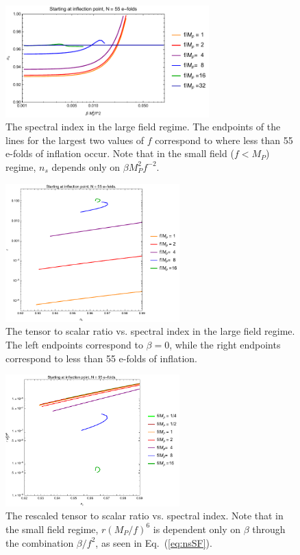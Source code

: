 \documentclass[aps,amsfonts,amsmath,prd,preprint,nofootinbib,superscriptaddress]{revtex4}
\newcommand{\Mp}{{M_{P}}}
\newcommand{\MMp}{{M_P^2}}
\begin{document}
\begin{figure}[!h]
  \centering
    \includegraphics[width=0.7\textwidth]{figures/nsvsb.pdf}
    \caption{The spectral index in the large field regime. The endpoints of the lines for the largest two values of $f$ correspond to where less than 55 e-folds of inflation occur.
    Note that in the small field ($f < \Mp$) regime, $n_s$ depends only on $\beta \MMp f^{-2}$.}
\end{figure}

\begin{figure}[!h]
  \centering
    \includegraphics[width=0.6\textwidth]{figures/nsrplotvsf.pdf}
    \caption{The tensor to scalar ratio vs. spectral index in the large field regime.  The left endpoints correspond to $\beta = 0$, while the right endpoints correspond to less than 55 e-folds of inflation.}
\end{figure}

\begin{figure}[!h]
  \centering
    \includegraphics[width=0.6\textwidth]{figures/nsrf6plotvsf.pdf}
    \caption{The rescaled tensor to scalar ratio vs. spectral index. Note that in the small field regime, $r (\Mp/f)^6$ is dependent only on $\beta$ through the combination $\beta/f^2$, as seen in Eq.~(\ref{eq:nsSF}).}
\end{figure}
\end{document}
